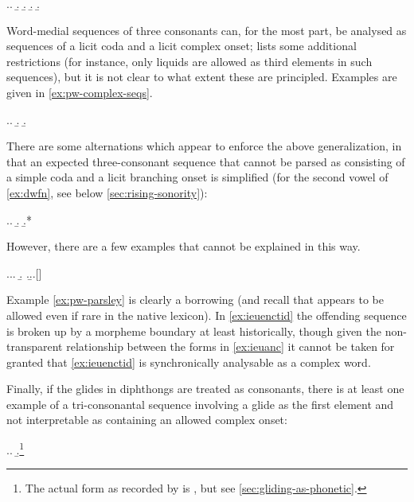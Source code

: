 \ex.\label{ex:pw-medial-seqs}\a.
\b.
\b.
\b.
\b.

Word-medial sequences of three consonants can, for the most part, be analysed as sequences of a licit coda and a licit complex onset; \citet[p.~109]{awbery86:_pembr_welsh} lists some additional restrictions (for instance, only liquids are allowed as third elements in such sequences), but it is not clear to what extent these are principled. Examples are given in \ref{ex:pw-complex-seqs}.

\ex.\label{ex:pw-complex-seqs}\a.
\b.
\b.

There are some alternations which appear to enforce the above generalization, in that an expected three\hyp consonant sequence that cannot be parsed as consisting of a simple coda and a licit branching onset is simplified (for the second vowel of \cref{ex:dwfn}, see below \cref{sec:rising-sonority}):

\ex.\a.\label{ex:dwfn}
\b.
\b.*\mbi{[ˈdʊvnder]}

However, there are a few examples that cannot be explained in this way.

\ex.\a.\label{ex:ieuanc}\a.
\b.\label{ex:ieuenctid}
\z.\b.\label{ex:pw-parsley}\a.[]

Example \ref{ex:pw-parsley} is clearly a borrowing (and recall that \ipa{[sl]} appears to be allowed even if rare in the native lexicon). In \ref{ex:ieuenctid} the offending sequence is broken up by a morpheme boundary at least historically, though given the non-transparent relationship between the forms in \ref{ex:ieuanc} it cannot be taken for granted that \ref{ex:ieuenctid} is synchronically analysable as a complex word.

Finally, if the glides in diphthongs are treated as consonants, there is at least one example of a tri\hyp consonantal sequence involving a glide as the first element and not interpretable as containing an allowed complex onset:

\ex.\a.
\b.\footnote{The actual form as recorded by \citet{awbery86:_pembr_welsh} is , but see \cref{sec:gliding-as-phonetic}.}

